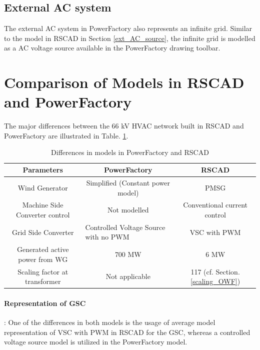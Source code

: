 \subsection{External AC system}
The external \gls{AC} system in PowerFactory also represents an infinite grid. Similar to the model in RSCAD in Section \ref{ext_AC_source}, the infinite grid is modelled as a \gls{AC} voltage source available in the PowerFactory drawing toolbar. 

\section{Comparison of Models in RSCAD and PowerFactory }
The major differences between the 66 kV \gls{HVAC} network built in RSCAD and PowerFactory are illustrated in Table. \ref{tab:Comp_RSCAD_PFD_Para}. 
\vspace{-1mm}
\begingroup
\renewcommand{\arraystretch}{1.2} %
\begin{table}[H]
\centering
\begin{tabular}{|c|c|c|}
\hline
\textbf{Parameters}            & \textbf{PowerFactory} & \textbf{RSCAD}            \\ \hline
Wind Generator         & Simplified (Constant power model)          & PMSG                      \\ \hline
Machine Side Converter control        & Not modelled          & Conventional current control \\ \hline
Grid Side Converter & \multicolumn{1}{l|}{Controlled Voltage Source with no PWM} & {VSC with PWM} \\ \hline
Generated active power from WG & 700 MW                & 6 MW                      \\ \hline
Scaling factor at transformer  & Not applicable        & 117 (cf. Section. \ref{scaling_OWF})                      \\ \hline
\end{tabular}
\caption{Differences in models in PowerFactory and RSCAD}
\label{tab:Comp_RSCAD_PFD_Para}
\end{table}
\endgroup

\vspace{-6mm}
\paragraph{Representation of \gls{GSC}}: One of the differences in both models is the usage of average model representation of \gls{VSC} with \gls{PWM} in RSCAD for the \gls{GSC}, whereas a controlled voltage source model is utilized in the PowerFactory model.
\vspace{-3mm}
